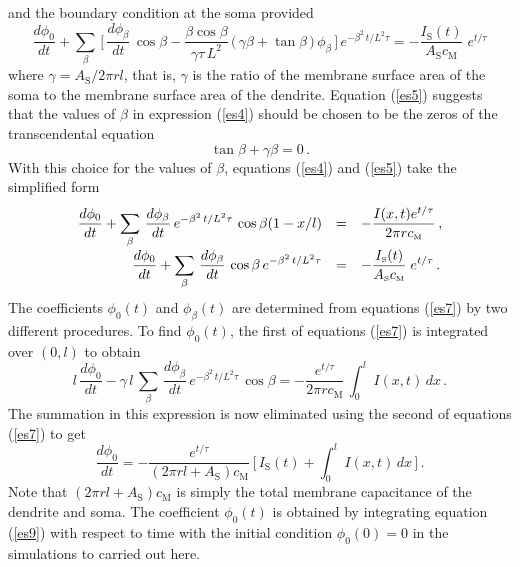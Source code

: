 and the boundary condition at the soma provided
\begin{equation}\label{es5}
\frac{d\phi_0}{dt}+\sum_\beta\,\Big[\,\frac{d\phi_\beta}{dt}\,
\cos\beta-\frac{\beta\cos\beta}{\gamma\tau\,L^2}\,\Big(\,
\gamma\beta+\tan\beta\,\Big)\,\phi_\beta\,\Big]
\,e^{-\beta^2\,t/L^2\tau}= -\frac{I_\mathrm{S}(t)}{A_\mathrm{S}
c_\mathrm{M}}\; e^{t/\tau}
\end{equation}
where $\gamma=A_\mathrm{S}/2\pi r l$, that is, $\gamma$ is the
ratio of the membrane surface area of the soma to the membrane
surface area of the dendrite. Equation (\ref{es5}) suggests that
the values of $\beta$ in expression (\ref{es4}) should be chosen
to be the zeros of the transcendental equation
\begin{equation}\label{es6}
\tan\beta+\gamma\beta = 0\,.
\end{equation}
With this choice for the values of $\beta$, equations (\ref{es4})
and (\ref{es5}) take the simplified form
\begin{equation}\label{es7}
\begin{array}{rcl}
\displaystyle\frac{d\phi_0}{dt}+\sum_\beta\,\frac{d\phi_\beta}{dt}
\,e^{-\beta^2\,t/L^2\tau}\,\cos{\beta(1-x/l)}
& = & -\displaystyle\frac{I(x,t)e^{t/\tau}}{2\pi r c_{\mbox{\tiny M}}}\,, \\[12pt]
\displaystyle\frac{d\phi_0}{dt}+\sum_\beta\,\frac{d\phi_\beta}{dt}\,
\cos\beta\,e^{-\beta^2\,t/L^2\tau} & = & -
\displaystyle\frac{I_{\mbox{\tiny S}}(t)}{A_{\mbox{\tiny S}}c_{\mbox{\tiny M}}}
\; e^{t/\tau}\,.
\end{array}
\end{equation}
The coefficients $\phi_0(t)$ and $\phi_\beta(t)$ are determined
from equations (\ref{es7}) by two different procedures. To find
$\phi_0(t)$, the first of equations (\ref{es7}) is integrated over
$(0,l)$ to obtain
\begin{equation}\label{es8}
l\,\frac{d\phi_0}{dt}-\gamma\,l\,\sum_\beta\,\frac{d\phi_\beta}{dt}
\,e^{-\beta^2\,t/L^2\tau}\,\cos\beta
= -\frac{e^{t/\tau}}{2\pi r c_\mathrm{M}}\,\int_0^l\,I(x,t)\,dx\,.
\end{equation}
The summation in this expression is now eliminated using the
second of equations (\ref{es7}) to get
\begin{equation}\label{es9}
\frac{d\phi_0}{dt}= -\frac{e^{t/\tau}}
{(2\pi r l+A_\mathrm{S})c_\mathrm{M}}\,\Big[\,
I_\mathrm{S}(t)+\int_0^l\,I(x,t)\,dx\,\Big]\,.
\end{equation}
Note that $(2\pi r l+A_\mathrm{S})c_\mathrm{M}$ is simply the
total membrane capacitance of the dendrite and soma. The
coefficient $\phi_0(t)$ is obtained by integrating equation
(\ref{es9}) with respect to time with the initial condition
$\phi_0(0)=0$ in the simulations to carried out here.

